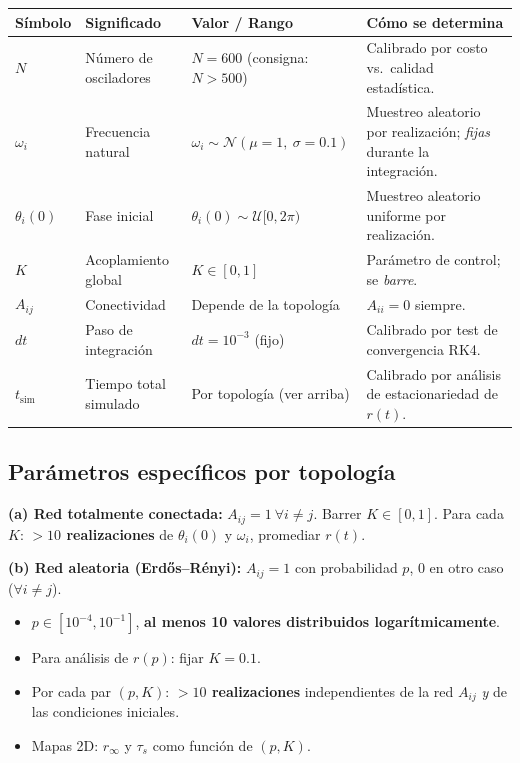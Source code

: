 \documentclass[11pt,a4paper]{article}
\begin{document}
\begin{center}
\renewcommand{\arraystretch}{1.25}
\begin{tabular}{@{}p{1.4cm} p{4.6cm} p{4.6cm} p{4.6cm}@{}}
\toprule
\textbf{Símbolo} & \textbf{Significado} & \textbf{Valor / Rango} & \textbf{Cómo se determina} \\
\midrule
$N$ & Número de osciladores & $N = 600$ (consigna: $N>500$) & Calibrado por costo vs.\ calidad estadística. \\
$\omega_i$ & Frecuencia natural & $\omega_i \sim \mathcal{N}(\mu{=}1,\ \sigma{=}0.1)$ & Muestreo aleatorio por realización; \emph{fijas} durante la integración. \\
$\theta_i(0)$ & Fase inicial & $\theta_i(0) \sim \mathcal{U}[0, 2\pi)$ & Muestreo aleatorio uniforme por realización. \\
$K$ & Acoplamiento global & $K \in [0, 1]$ & Parámetro de control; se \emph{barre}. \\
$A_{ij}$ & Conectividad & Depende de la topología & $A_{ii}=0$ siempre. \\
$dt$ & Paso de integración & $dt = 10^{-3}$ (fijo) & Calibrado por test de convergencia RK4. \\
$t_{\text{sim}}$ & Tiempo total simulado & Por topología (ver arriba) & Calibrado por análisis de estacionariedad de $r(t)$. \\
\bottomrule
\end{tabular}
\end{center}

\subsection*{Parámetros específicos por topología}

\textbf{(a) Red totalmente conectada:}
$A_{ij}=1\ \forall i\neq j$. Barrer $K\in[0,1]$. Para cada $K$: \textbf{$>10$ realizaciones} de $\theta_i(0)$ y $\omega_i$, promediar $r(t)$.

\medskip
\textbf{(b) Red aleatoria (Erdős--Rényi):}
$A_{ij}=1$ con probabilidad $p$, $0$ en otro caso ($\forall i\neq j$).
\begin{itemize}
  \item $p \in [10^{-4}, 10^{-1}]$, \textbf{al menos 10 valores distribuidos logarítmicamente}.
  \item Para análisis de $r(p)$: fijar $K=0.1$.
  \item Por cada par $(p, K)$: \textbf{$>10$ realizaciones} independientes de la red $A_{ij}$ \emph{y} de las condiciones iniciales.
  \item Mapas 2D: $r_\infty$ y $\tau_s$ como función de $(p, K)$.
\end{itemize}
\end{document}
